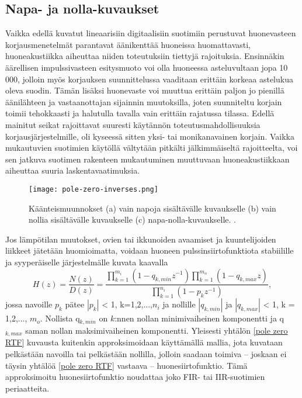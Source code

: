 \documentclass[finnish,12pt]{article}
\begin{document}
\subsection{Napa- ja nolla-kuvaukset}

Vaikka edellä kuvatut lineaarisiin digitaalisiin suotimiin perustuvat huonevasteen korjausmenetelmät parantavat äänikenttää huoneissa huomattavasti, huoneakustiikka aiheuttaa niiden toteutuksiin tiettyjä rajoituksia. Ensinnäkin äärellisen impulssivasteen esitysmuoto voi olla huoneessa asteluvultaan jopa 10 000, jolloin myös korjauksen suunnittelussa vaaditaan erittäin korkeaa astelukua oleva suodin. Tämän lisäksi huonevaste voi muuttua erittäin paljon jo pienillä äänilähteen ja vastaanottajan sijainnin muutoksilla, joten suunniteltu korjain toimii tehokkaasti ja halutulla tavalla vain erittäin rajatussa tilassa. Edellä mainitut seikat rajoittavat suuresti käytännön toteutusmahdollisuuksia korjausjärjestelmille, oli kyseessä sitten yksi- tai monikanavainen korjain. Vaikka mukautuvien suotimien käytöllä vältytään pitkälti jälkimmäiseltä rajoitteelta, voi sen jatkuva suotimen rakenteen mukautuminen muuttuvaan huoneakustiikkaan aiheuttaa suuria laskentavaatimuksia. \cite{YHaneda1994, Mourjopoulos1991}

\begin{figure}[h!]
\centering
\texttt{[image: pole-zero-inverses.png]}
\caption{Käänteismuunnokset (a) vain napoja sisältävälle kuvaukselle (b) vain nollia sisältävälle kuvaukselle (c) napa-nolla-kuvaukselle. \cite{Mourjopoulos1991}.}
\label{fig:pole-zero inverses}
\end{figure}

Jos lämpötilan muutokset, ovien tai ikkunoiden avaamiset ja kuuntelijoiden liikkeet jätetään huomioimatta, voidaan huoneen pulssinsiirtofunktiota stabiilille ja syyperäiselle järjestelmälle kuvata kaavalla \begin{equation}
H(z) = \frac{N(z)}{D(z)} = \frac{\prod\limits_{k=1}^{m_i} (1-q_{k,min} z^{-1}) \prod\limits_{k=1}^{m_o} (1-q_{k, max} z) }{ \prod\limits_{k=1}^{n_i} (1-p_k z^{-1}) },
\label{pole zero RTF}
\end{equation} jossa navoille $p_k$ pätee $\left| p_k \right|$ < 1, k=1,2,...,$n_i$ ja nollille $\left| q_{k, min} \right|$ ja $\left| q_{k, max} \right|$ < 1, k = 1,2,..., $m_o$. Nollista q$_{k, min}$ on $k$:nnen nollan minimivaiheinen komponentti ja q$_{k, max}$ saman nollan maksimivaiheinen komponentti. Yleisesti yhtälön \eqref{pole zero RTF} kuvausta kuitenkin approksimoidaan käyttämällä mallia, jota kuvataan pelkästään navoilla tai pelkästään nollilla, jolloin saadaan toimiva -- joskaan ei täysin yhtälöä \eqref{pole zero RTF} vastaava -- huonesiirtofunktio. Tämä approksimoitu huonesiirtofunktio noudattaa joko FIR- tai IIR-suotimien periaatteita. \cite{Mourjopoulos1991}
\end{document}
